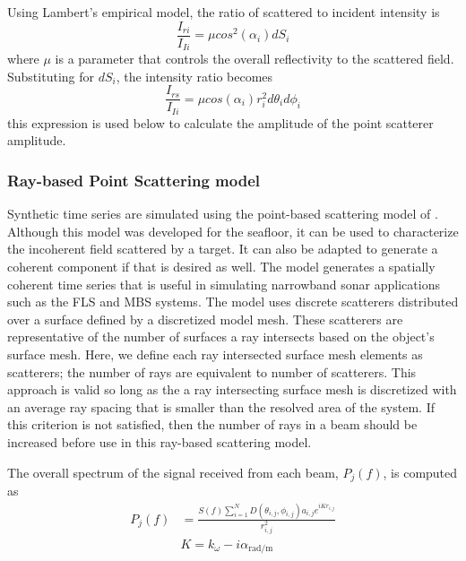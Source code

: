 \documentclass[utf8]{frontiersSCNS} %
\begin{document}
Using Lambert's empirical model, the ratio of scattered to incident intensity is
\begin{equation}
    \frac{I_{ri}}{I_{Ii}} = \mu cos^2(\alpha_i)dS_i
\end{equation}
where $\mu$ is a parameter that controls the overall reflectivity to the scattered field. Substituting for $dS_i$, the intensity ratio becomes
\begin{equation}
    \frac{I_{rs}}{I_{Ii}}= \mu cos(\alpha_i)r_i^2d\theta_id\phi_i
\end{equation}
this expression is used below to calculate the amplitude of the point scatterer amplitude.

\subsubsection{Ray-based Point Scattering model}

Synthetic time series are simulated using the point-based scattering model of \cite{brown17point}. Although this model was developed for the seafloor, it can be used to characterize the incoherent field scattered by a target. It can also be adapted to generate a coherent component if that is desired as well. The model generates a spatially coherent time series that is useful in simulating narrowband sonar applications such as the FLS and MBS systems. The model uses discrete scatterers distributed over a surface defined by a discretized model mesh. These scatterers are representative of the number of surfaces a ray intersects based on the object's surface mesh. Here, we define each ray intersected surface mesh elements as scatterers; the number of rays are equivalent to number of scatterers. This approach is valid so long as the a ray intersecting surface mesh is discretized with an average ray spacing that is smaller than the resolved area of the system. If this criterion is not satisfied, then the number of rays in a beam should be increased before use in this ray-based scattering model.

The overall spectrum of the signal received from each beam, $P_j(f)$, is computed as
\begin{align}
    P_j(f) &= \frac{S(f)\sum^N_{i=1}D(\theta_{i,j},\phi_{i,j})a_{i,j}e^{iKr_{i,j}}}{r_{i,j}^2} 
    \label{e:scatteringmodel} \\
    & K = k_\omega - i\alpha_{\textrm{rad/m}} \nonumber
\end{align}
\end{document}
